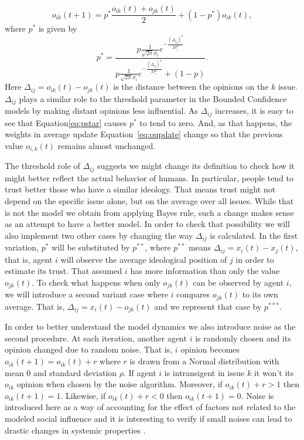 \documentclass{article}
\begin{document}
  \begin{equation}\label{eq:oupdate}
    o_{ik}(t+1) =
    p^{*}
    \frac{o_{ik}(t) + o_{jk}(t) }{2}
    +
    (1 - p^{*})
    o_{ik}(t),
  \end{equation}
where  $p^{*}$ is given by
  \begin{equation}\label{eq:pstar}
   p^{*}
    =
  \frac{
      p \frac{1}{\sqrt{2 \pi} \sigma_i}
      e^{- \frac{ (\Delta_{ij})^2}{2 \sigma_i^2}}
    }{
      p
      \frac{1}{\sqrt{2 \pi} \sigma_i}
    e^{- \frac{ ( \Delta_{ij})^2}{2 \sigma_i^2}}
    +
    (1 - p)
  }.
  \end{equation}
Here \(\Delta_{ij} = o_{ik} (t) - o_{jk} (t)\) is the distance between the opinions on the $k$ issue. $\Delta_{ij}$ plays a
similar role to the threshold parameter in the Bounded Confidence models by making distant opinions less influential. As $\Delta_{ij}$ increases, it is easy to see that Equation\ref{eq:pstar} causes  $p^{*}$ to tend to zero. And, as that happens, the weights in average update Equation~\ref{eq:oupdate} change so that the previous value $ o_{i,k}(t)$ remains almost unchanged.

The threshold role of $\Delta_{ij}$ suggests we might change its definition to check how it might better reflect the actual behavior of humans. In particular, people tend to trust better those who have a similar ideology. That means trust might not depend on the specific issue alone, but on the average over all issues. While that is not the model we obtain from applying Bayes rule, such a change makes sense
as an attempt to have a better model. In order to check that possibility we will also implement two other cases by changing the way $\Delta_{ij}$ is calculated. In the first variation, $p^*$ will be substituted by \(p^{**}\), where \(p^{**}\) means 
 \(\Delta_{ij} = x_i(t) - x_j(t) \), that is, agent $i$ will observe the average
 ideological position of $j$ in order to estimate its trust. That assumed $i$
 has more information than only the value $o_{jk}(t)$. To check what happens
 when only $o_{jk}(t)$ can be observed by agent $i$, we will introduce a second variant case where $i$ compares $o_{jk}(t)$ to its own average. That is,  \(\Delta_{ij} = x_{i}(t) - o_{jk}(t)\) and we represent that case by \(p^{***}\).

In order to better understand the model dynamics we also introduce noise as the second procedure. At each iteration, 
another agent \(i\) is randomly chosen and its opinion changed due to random noise. That is, $i$ opinion becomes \(
o_{ik}(t+1) = o_{ik}(t) + r \) where \(r\) is drawn from a Normal
distribution with mean 0 and standard deviation \(\rho\). If agent \(i\) is intransigent in
issue \(k\) it won't its \(o_{ik}\) opinion when chosen by
the noise algorithm. Moreover, if \(o_{ik}(t) + r > 1\) then \( o_{ik}(t+1) =
1\). Likewise, if \(o_{ik}(t) + r < 0 \) then \( o_{ik}(t+1) = 0\). Noise
is introduced here as a way of accounting for the effect of factors not related to the modeled
social influence \cite{flache2017} and it is interesting to verify if small noises can lead to drastic changes in
systemic properties \cite{macy2015signal}.
\end{document}
